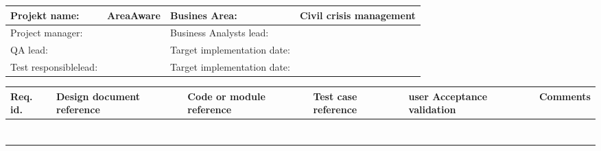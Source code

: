 \begin{sidewaystable}
	\begin{longtable}{| p{3.5cm}  | p{4.2cm} |  p{5cm}  | p{4cm} |  }
		\hline
		Projekt name: 	& AreaAware & Busines Area:	& Civil crisis management \\ \hline
		Project manager:& & Business Analysts lead: 	& \\ \hline
		QA lead: 		& & Target implementation date:	& \\ \hline
		Test responsiblelead: 		& & Target implementation date:	& \\ \hline
	\end{longtable}
	\vspace{-9pt}
	\begin{longtable}{| p{1.1cm}  | p{2cm}  | p{4.2cm} |  p{1.5cm}  | p{4cm}  |  p{3cm}  |} \hline
		Req. id. & Design document reference & Code or module reference & Test case reference & user Acceptance validation  & Comments \\ \hline	
		&& && & \\ \hline
		&& && & \\ \hline
		&& && &\\ \hline
		&& && & \\ \hline
		&& && & \\ \hline
		&& && &  \\ \hline
		&& && &  \\ \hline
	\end{longtable}
\end{sidewaystable}



